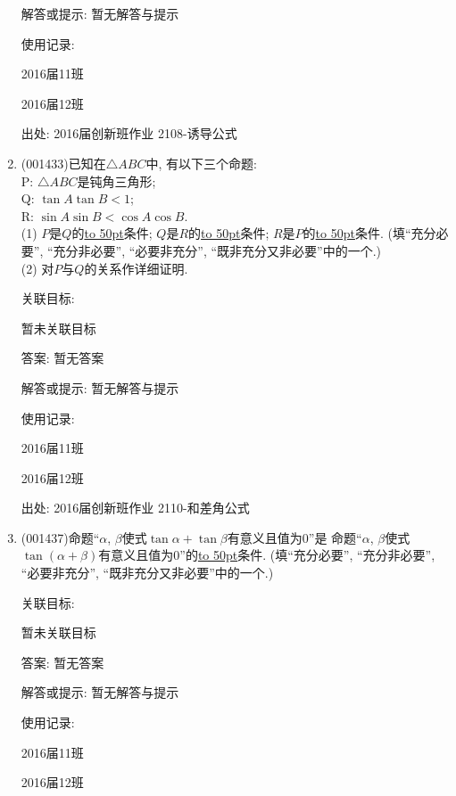 \documentclass[10pt,a4paper]{article}
\newcommand{\blank}[1]{\underline{\hbox to #1pt{}}}
\begin{document}
\begin{enumerate}[1.]
解答或提示: 暂无解答与提示

使用记录:

2016届11班	

2016届12班	


出处: 2016届创新班作业	2108-诱导公式
\item { (001433)}已知在$\triangle ABC$中, 有以下三个命题:\\ 
P: $\triangle ABC$是钝角三角形;\\ 
Q: $\tan A\tan B<1$;\\ 
R: $\sin A\sin B<\cos A\cos B$.\\ 
(1) $P$是$Q$的\blank{50}条件; $Q$是$R$的\blank{50}条件; $R$是$P$的\blank{50}条件.
(填``充分必要'', ``充分非必要'', ``必要非充分'', ``既非充分又非必要''中的一个.)\\ 
(2) 对$P$与$Q$的关系作详细证明.


关联目标:

暂未关联目标

答案: 暂无答案

解答或提示: 暂无解答与提示

使用记录:

2016届11班		

2016届12班		


出处: 2016届创新班作业	2110-和差角公式
\item { (001437)}命题``$\alpha$, $\beta$使式$\tan\alpha+\tan\beta$有意义且值为$0$''是
命题``$\alpha$, $\beta$使式$\tan(\alpha+\beta)$有意义且值为$0$''的\blank{50}条件.
(填``充分必要'', ``充分非必要'', ``必要非充分'', ``既非充分又非必要''中的一个.)


关联目标:

暂未关联目标

答案: 暂无答案

解答或提示: 暂无解答与提示

使用记录:

2016届11班	

2016届12班	



\end{enumerate}
\end{document}
